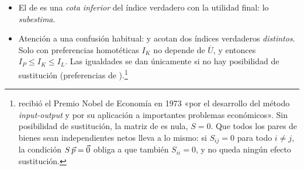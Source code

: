\documentclass[11pt]{article}
\begin{document}
\begin{itemize}
\begin{itemize}
\begin{itemize}
    \item Por la concavidad de $E$, es una \emph{cota superior}: \emph{sobrestima} el aumento del coste de la vida porque supone que el consumidor no sustituye los bienes que se encarecen por los que se abaratan (\emph{sesgo de sustitución}).\footnote{Los dos índices fallan en sentidos opuestos:
\begin{itemize}
\item con $I_L$: si la renta se actualiza con él, el consumidor puede volver a comprar la cesta inicial $\vect{x}^0$ y, sustituyendo los bienes que se han encarecido por los que se han abaratado, alcanzar una utilidad \emph{mayor} que $\overline{U}^0$: queda sobrecompensado;
\item con $I_P$ ocurre lo contrario: la cesta final valorada a los precios iniciales cuesta al menos lo necesario para alcanzar $\overline{U}^1$ con esos precios, $\vect{p}^0\cdot\vect{x}^1\geq E(\vect{p}^0,\overline{U}^1)$, de modo que $I_P=\overline{W}/(\vect{p}^0\cdot\vect{x}^1)\leq\overline{W}/E(\vect{p}^0,\overline{U}^1)=I_K(\overline{U}^1)$: ignorar la sustitución lleva a subestimar el encarecimiento medido con la utilidad final.\findemo
\end{itemize}}
    \item En el gráfico~\ref{fig:indice-konus-laspeyres}, ese sesgo es la distancia entre la recta de precios $\vect{p}^1$ que pasa por $\vect{x}^0$ y su paralela tangente a $\overline{U}^0$.
    \end{itemize}
  \item El de \emph{} es una \emph{cota inferior} del índice verdadero con la utilidad final: lo \emph{subestima}.
  \item Atención a una confusión habitual:  y  acotan dos índices verdaderos \emph{distintos}. Solo con preferencias homotéticas $I_K$ no depende de $\overline{U}$, y entonces $I_P\leq I_K\leq I_L$. Las igualdades se dan únicamente si no hay posibilidad de sustitución (preferencias de ).\footnote{ recibió el Premio Nobel de Economía en 1973 «por el desarrollo del método \emph{input-output} y por su aplicación a importantes problemas económicos»\nocite{Nobel1973Leontief}. Sin posibilidad de sustitución, la matriz de  es nula, $S=0$. Que todos los pares de bienes sean independientes netos lleva a lo mismo: si $S_{ij}=0$ para todo $i\neq j$, la condición $S\,\vec{p}=\vec{0}$ obliga a que también $S_{ii}=0$, y no queda ningún efecto sustitución.\findemo}
  \end{itemize}
\end{itemize}
\end{document}
